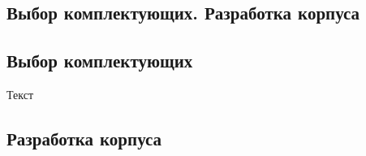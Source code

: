 
	\newpage
		\begin{center}	
				\section{Выбор комплектующих. Разработка корпуса}
		\end{center}
		\subsection{Выбор комплектующих}
	Текст 
		\newline

	
		\subsection{Разработка корпуса}
		

   
		 
		
